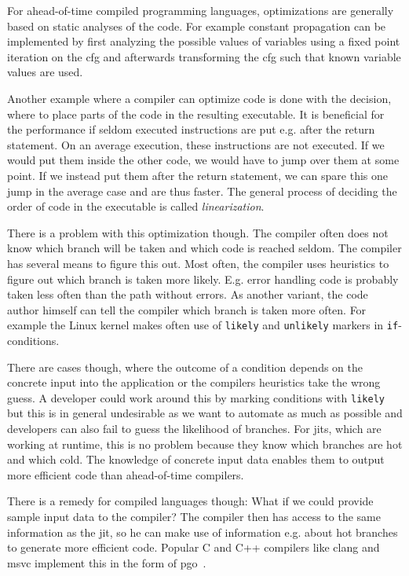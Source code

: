 For ahead-of-time compiled programming languages, optimizations are generally based on static analyses of the code. For example constant propagation can be implemented by first analyzing the possible values of variables using a fixed point iteration on the \gls{cfg} and afterwards transforming the \gls{cfg} such that known variable values are used.~\cite{Seidl2010}

Another example where a compiler can optimize code is done with the decision, where to place parts of the code in the resulting executable. It is beneficial for the performance if seldom executed instructions are put e.g. after the return statement. On an average execution, these instructions are not executed. If we would put them inside the other code, we would have to jump over them at some point. If we instead put them after the return statement, we can spare this one jump in the average case and are thus faster. The general process of deciding the order of code in the executable is called \emph{linearization}.

There is a problem with this optimization though. The compiler often does not know which branch will be taken and which code is reached seldom. The compiler has several means to figure this out. Most often, the compiler uses heuristics to figure out which branch is taken more likely. E.g. error handling code is probably taken less often than the path without errors. As another variant, the code author himself can tell the compiler which branch is taken more often. For example the Linux kernel makes often use of \texttt{likely} and \texttt{unlikely} markers in \texttt{if}-conditions.

There are cases though, where the outcome of a condition depends on the concrete input into the application or the compilers heuristics take the wrong guess. A developer could work around this by marking conditions with \texttt{likely} but this is in general undesirable as we want to automate as much as possible and developers can also fail to guess the likelihood of branches. For \glspl{jit}, which are working at runtime, this is no problem because they know which branches are hot and which cold. The knowledge of concrete input data enables them to output more efficient code than ahead-of-time compilers.

There is a remedy for compiled languages though: What if we could provide sample input data to the compiler? The compiler then has access to the same information as the \gls{jit}, so he can make use of information e.g. about hot branches to generate more efficient code. Popular C and C++ compilers like clang and msvc implement this in the form of \gls{pgo}~\cite{ClangManual, MicrosoftPgo}.

